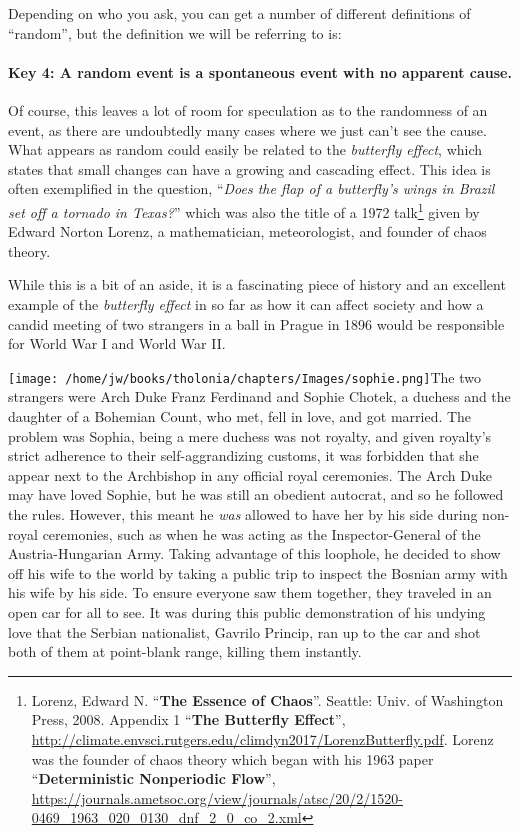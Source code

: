 \documentclass[
]{article}
\begin{document}
Depending on who you ask, you can get a number of different definitions
of ``random'', but the definition we will be referring to is:

\paragraph{\texorpdfstring{\textbf{Key 4:} A random event is a
spontaneous event with no apparent
cause.}{Key 4: A random event is a spontaneous event with no apparent cause.}}\label{key-4-a-random-event-is-a-spontaneous-event-with-no-apparent-cause}

Of course, this leaves a lot of room for speculation as to the
randomness of an event, as there are undoubtedly many cases where we
just can't see the cause. What appears as random could easily be related
to the \emph{butterfly effect}, which states that small changes can have
a growing and cascading effect. This idea is often exemplified in the
question, ``\emph{Does the flap of a butterfly's wings in Brazil set off
a tornado in Texas?}'' which was also the title of a 1972
talk\footnote{Lorenz, Edward N. ``\textbf{The Essence of Chaos}''.
  Seattle: Univ. of Washington Press, 2008. Appendix 1 ``\textbf{The
  Butterfly Effect}'',
  \url{http://climate.envsci.rutgers.edu/climdyn2017/LorenzButterfly.pdf}.
  Lorenz was the founder of chaos theory which began with his 1963 paper
  ``\textbf{Deterministic Nonperiodic Flow}'',
  \url{https://journals.ametsoc.org/view/journals/atsc/20/2/1520-0469_1963_020_0130_dnf_2_0_co_2.xml}}
given by Edward Norton Lorenz, a mathematician, meteorologist, and
founder of chaos theory.

While this is a bit of an aside, it is a fascinating piece of history
and an excellent example of the \emph{butterfly effect} in so far as how
it can affect society and how a candid meeting of two strangers in a
ball in Prague in 1896 would be responsible for World War I and World
War II.

\texttt{[image: /home/jw/books/tholonia/chapters/Images/sophie.png]}The
two strangers were Arch Duke Franz Ferdinand and Sophie Chotek, a
duchess and the daughter of a Bohemian Count, who met, fell in love, and
got married. The problem was Sophia, being a mere duchess was not
royalty, and given royalty's strict adherence to their self-aggrandizing
customs, it was forbidden that she appear next to the Archbishop in any
official royal ceremonies. The Arch Duke may have loved Sophie, but he
was still an obedient autocrat, and so he followed the rules. However,
this meant he \emph{was} allowed to have her by his side during
non-royal ceremonies, such as when he was acting as the
Inspector-General of the Austria-Hungarian Army. Taking advantage of
this loophole, he decided to show off his wife to the world by taking a
public trip to inspect the Bosnian army with his wife by his side. To
ensure everyone saw them together, they traveled in an open car for all
to see. It was during this public demonstration of his undying love that
the Serbian nationalist, Gavrilo Princip, ran up to the car and shot
both of them at point-blank range, killing them instantly.
\end{document}
